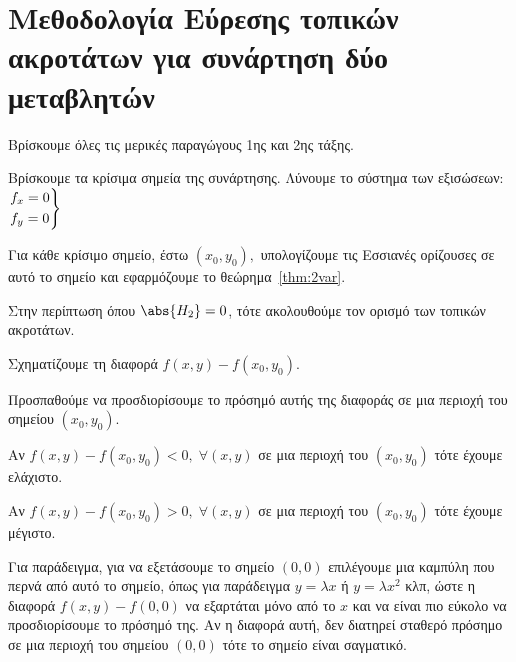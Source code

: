 \documentclass[a4paper,table]{report}
\begin{document}
\section{Μεθοδολογία Εύρεσης τοπικών ακροτάτων για συνάρτηση δύο μεταβλητών}

\begin{enumerate}
  \item Βρίσκουμε όλες τις μερικές παραγώγους 1ης και 2ης τάξης.
  \item Βρίσκουμε τα κρίσιμα σημεία της συνάρτησης. Λύνουμε το σύστημα των εξισώσεων: 
    $ \begin{rcases}
      f_{x} = 0 \\
      f_{y} = 0  
    \end{rcases} $ 
  \item Για κάθε κρίσιμο σημείο, έστω $ (x_{0}, y_{0}), $ υπολογίζουμε τις Εσσιανές 
    ορίζουσες σε αυτό το σημείο και εφαρμόζουμε το θεώρημα~\ref{thm:2var}.
  \item Στην περίπτωση όπου $ \abs{H_{2}} = 0 $, τότε ακολουθούμε τον ορισμό των 
    τοπικών ακροτάτων.
    \begin{myitemize}
      \item Σχηματίζουμε τη διαφορά $ f(x,y) - f(x_{0}, y_{0}) $.
      \item Προσπαθούμε να προσδιορίσουμε το πρόσημό αυτής της διαφοράς σε 
        μια περιοχή του σημείου $ (x_{0}, y_{0}) $.
        \begin{myitemize}
          \item Αν $ f(x,y) - f(x_{0}, y_{0}) < 0, \; \forall (x,y) $ σε μια
            περιοχή του $ (x_{0}, y_{0}) $ τότε έχουμε ελάχιστο. 
          \item Αν $ f(x,y) - f(x_{0}, y_{0}) > 0, \; \forall (x,y) $ σε μια
            περιοχή του $ (x_{0}, y_{0}) $ τότε έχουμε μέγιστο. 
        \end{myitemize}
      \item Για παράδειγμα, για να εξετάσουμε το σημείο $ (0,0) $ επιλέγουμε μια 
        καμπύλη που περνά από αυτό το σημείο, όπως για παράδειγμα 
        $ y= \lambda x $ ή $ y= \lambda x^{2} $ κλπ, ώστε η διαφορά 
        $ f(x,y) - f(0, 0) $ να εξαρτάται μόνο από το $x$ και να 
        είναι πιο εύκολο να προσδιορίσουμε το πρόσημό της. Αν η διαφορά αυτή, δεν 
        διατηρεί σταθερό πρόσημο σε μια περιοχή του σημείου $ (0,0) $ τότε το σημείο 
        είναι σαγματικό.
    \end{myitemize}
\end{enumerate}
\end{document}
